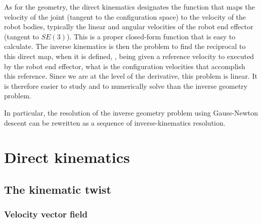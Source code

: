 \documentclass{book}
\begin{document}
As for the geometry, the direct kinematics designates the function that maps the velocity of the joint (tangent to the configuration space) to the velocity of the robot bodies, typically the linear and angular velocities of the robot end effector (tangent to $SE(3)$). This is a proper closed-form function that is easy to calculate. The inverse kinematics is then the problem to find the reciprocal to this direct map, when it is defined, \mie, being given a reference velocity to executed by the robot end effector, what is the configuration velocities that accomplish this reference. Since we are at the level of the derivative, this problem is linear. It is therefore easier to study and to numerically solve than the inverse geometry problem. 

In particular, the resolution of the inverse geometry problem using Gauss-Newton descent can be rewritten as a sequence of inverse-kinematics resolution. 


\chapter{Direct kinematics}

\section{The kinematic twist}

\subsection{Velocity vector field}
\end{document}
